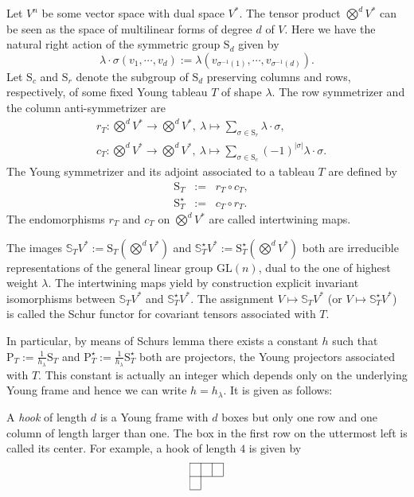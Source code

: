 \documentclass[11pt,a4paper]{article}
\theoremstyle{plain}
\theoremstyle{remark}
\newcommand{\GL}{\mathrm{GL}}
\newcommand{\rmP}{\mathrm{P}}
\newcommand{\rmS}{\mathrm{S}}
\newcommand{\bbS}{\mathbb{S}}
\begin{document}
Let $V^n$ be some vector space with dual space $V^*$. 
The tensor product $\bigotimes^d V^*$ can be seen as the space of multilinear forms of degree $d$ of $V$.
Here we have the natural right action of the symmetric group $\rmS_d$ given by
\begin{equation*}
\lambda \cdot \sigma(v_1, \cdots, v_d) := \lambda(v_{\sigma^{-1}(1)}, \cdots,v_{\sigma^{-1}(d)}).
\end{equation*}
Let $\rmS_c$ and $\rmS_r$ denote the
subgroup of $\rmS_d$ preserving columns and rows, respectively, of some fixed Young tableau $T$ of shape $\lambda$. The row symmetrizer 
and the column anti-symmetrizer  are
\begin{align}\label{eq:def_r_lambda}
&r_T \colon \bigotimes^dV^* \to \bigotimes^dV^*,\ \lambda \mapsto 
\sum_{\sigma\in \rmS_r} \lambda\cdot \sigma,\\
\label{eq:def_c_lambda}
&c_T \colon \bigotimes^dV^*\to \bigotimes^dV^*,\ \lambda \mapsto \sum_{\sigma\in \rmS_c} (-1)^{|\sigma|} \lambda\cdot\sigma.
\end{align}
The Young symmetrizer and its adjoint associated to a tableau $T$ are defined by 
\begin{align}
\label{eq:def_S_*_lambda}
&\rmS_T \;\;:=\;\; r_T\circ c_T,\\
\label{eq:def_S_lambda}
&\rmS^\star_T \;\;:=\;\;  c_T\circ r_T.
\end{align}
The endomorphisms $r_T$ and $c_T$ on
$\bigotimes^dV^*$ are called intertwining maps.

The images $\bbS_TV^* := \rmS_T(\bigotimes^dV^*)$ and $\bbS^\star_TV^* :=
\rmS^\star_T(\bigotimes^dV^*)$ both are irreducible representations of the
general linear group $\GL(n)$, dual to the one of highest weight $\lambda$. The intertwining maps yield by construction explicit invariant isomorphisms between $\bbS_TV^*$ and $\bbS^\star_TV^*$. 
The assignment $V \mapsto \bbS_TV^*$ (or $V \mapsto \bbS^\star_TV^*$) is called the Schur functor for covariant tensors associated with $T$.

In particular, by means of Schurs lemma there exists a constant $h$ such that $\rmP_T := \frac{1}{h_\lambda} \rmS_T$ and $\rmP^\star_T := \frac{1}{h_\lambda} \rmS^\star_T$ both are projectors, the Young projectors associated with $T$.
This constant is actually an integer which depends only on 
the underlying Young frame and hence we can write $h = h_\lambda$. It is given as follows:

A {\em hook} of length $d$ is a  Young frame with $d$ boxes but only one row and one column of length larger than
one. The box in the first row on the uttermost left is called its center.  For example, a hook of length $4$ is given by
\begin{equation}\label{eq:hook}
\begin{array}{|c|c|c|}
\cline{1-3}
 &  &  \\
\cline{1-3}
 & \multicolumn{2}{c}{\;\;}\\
 \cline{1-1}
\end{array}
\end{equation}
\end{document}
